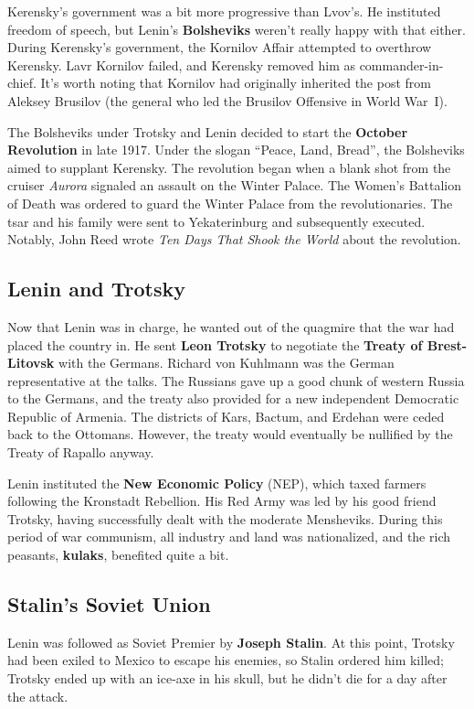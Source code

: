 Kerensky's government was a bit more progressive than Lvov's.
He instituted freedom of speech, but Lenin's \textbf{Bolsheviks} weren't really happy with that either.
During Kerensky's government, the Kornilov Affair attempted to overthrow Kerensky.
Lavr Kornilov failed, and Kerensky removed him as commander-in-chief.
It's worth noting that Kornilov had originally inherited the post from Aleksey Brusilov
(the general who led the Brusilov Offensive in World War~I).

The Bolsheviks under Trotsky and Lenin decided to start the \textbf{October Revolution} in late 1917.
Under the slogan ``Peace, Land, Bread'', the Bolsheviks aimed to supplant Kerensky.
The revolution began when a blank shot from the cruiser \textit{Aurora} signaled an assault on the Winter Palace.
The Women's Battalion of Death was ordered to guard the Winter Palace from the revolutionaries.
The tsar and his family were sent to Yekaterinburg and subsequently executed.
Notably, John Reed wrote \textit{Ten Days That Shook the World} about the revolution.

\subsection*{Lenin and Trotsky}

Now that Lenin was in charge, he wanted out of the quagmire that the war had placed the country in.
He sent \textbf{Leon Trotsky} to negotiate the \textbf{Treaty of Brest-Litovsk} with the Germans.
Richard von Kuhlmann was the German representative at the talks.
The Russians gave up a good chunk of western Russia to the Germans,
and the treaty also provided for a new independent Democratic Republic of Armenia.
The districts of Kars, Bactum, and Erdehan were ceded back to the Ottomans.
However, the treaty would eventually be nullified by the Treaty of Rapallo anyway.

Lenin instituted the \textbf{New Economic Policy} (NEP), which taxed farmers following the Kronstadt Rebellion.
His Red Army was led by his good friend Trotsky, having successfully dealt with the moderate Mensheviks.
During this period of war communism, all industry and land was nationalized,
and the rich peasants, \textbf{kulaks}, benefited quite a bit.

\subsection*{Stalin's Soviet Union}

Lenin was followed as Soviet Premier by \textbf{Joseph Stalin}.
At this point, Trotsky had been exiled to Mexico to escape his enemies, so Stalin ordered him killed;
Trotsky ended up with an ice-axe in his skull, but he didn't die for a day after the attack.

